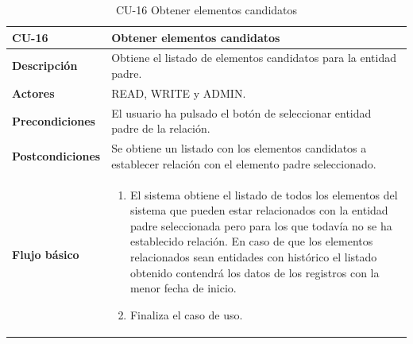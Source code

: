 \begin{table} [H]
    \centering
    \setlength{\leftmargini}{0.4cm}
	\resizebox{15cm}{!} { %
    \begin{tabular}{| m{3cm} | m{12cm} |}   
    \hline
	  \textbf{CU-16} & \textbf{Obtener elementos candidatos} \\\hline
	  \textbf{Descripción} & Obtiene el listado de elementos candidatos para la entidad padre. \\\hline
	  \textbf{Actores} & READ, WRITE y ADMIN. \\\hline
	  \textbf{Precondiciones} & El usuario ha pulsado el botón de seleccionar entidad padre de la relación. \\\hline
	  \textbf{Postcondiciones} & Se obtiene un listado con los elementos candidatos a establecer relación con el elemento padre seleccionado. \\\hline
	  \textbf{Flujo básico} & 
		\begin{enumerate}
	  	\item El sistema obtiene el listado de todos los elementos del sistema que pueden estar relacionados con la entidad padre seleccionada pero para los que todavía no se ha establecido relación. En caso de que los elementos relacionados sean entidades con histórico el listado obtenido contendrá los datos de los registros con la menor fecha de inicio.
		\item Finaliza el caso de uso.				
	  \end{enumerate} 	  	  
	  \\\hline
    \end{tabular}
    } %
    \caption{CU-16 Obtener elementos candidatos}
    \label{tab:cu-obtener-elementos-candidatos}
\end{table}



